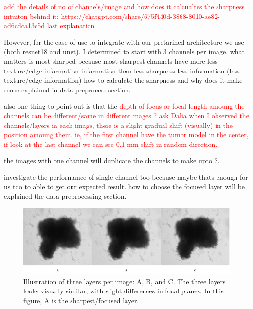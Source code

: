   \textcolor{red}{add the details of no of channels/image and how does it calcualtes the sharpness intuiton behind it: https://chatgpt.com/share/675f440d-3868-8010-ae82-ad6cdca13c5d last explanation}

  However, for the ease of use to integrate with our pretarined architecture we use (both resnet18 and unet),
  I determined to start with 3 channels per image. 
what matters is  most sharped because 
  most sharpest channels have more less texture/edge information information than less sharpness 
 less information (less texture/edge information) 
  how to calculate the sharpness and why does it make sense explained in data preprocess section.

  also one thing to point out is that the   \textcolor{red}{depth of focus or focal length amoung the channels can be different/same in different mages ? ask Dalia}
  \textcolor{red}{when I observed the channels/layers in each image, there is a slight gradual shift (visually) in the position amoung them. ie, if the first channel
   have the tumor model in the center, if look at the last channel we can see 0.1 mm shift in random direction.} 

  the images with one channel will duplicate the channels to make upto 3.
  
 
  investigate the performance of single channel too because maybe thats enough for us too to able to get our expected result.
  how to choose the focused layer will be explained the data preprocessing section.

\begin{figure}[H]
  \centering
  \includegraphics[scale=0.46]{figures/threes.png} 
  \caption{Illustration of three layers per image: A, B, and C. The three layers looks visually similar, with slight differences in focal planes. In this figure, A is the sharpest/focused layer.}
  \label{fig:Threes}
\end{figure}

